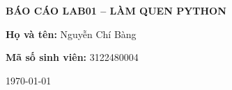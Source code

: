 \begin{titlepage}
  \centering

  \vspace*{1.5cm}

  {\Large \textbf{BÁO CÁO LAB01 – LÀM QUEN PYTHON}\par}

  \vspace{1.5cm}

  {\large \textbf{Họ và tên:} Nguyễn Chí Bàng\par}
  \vspace{0.3cm}
  {\large \textbf{Mã số sinh viên:} 3122480004\par}

  \vfill

  {\large \today\par}
\end{titlepage}


